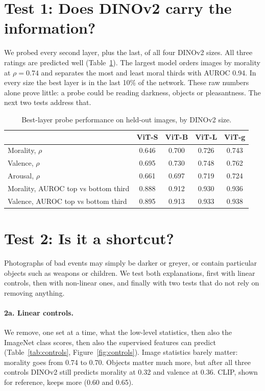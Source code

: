 \documentclass[11pt]{article}
\begin{document}
\section{Test 1: Does DINOv2 carry the information?}

We probed every second layer, plus the last, of all four DINOv2 sizes. All three ratings are predicted well (Table~\ref{tab:base}). The largest model orders images by morality at $\rho=0.74$ and separates the most and least moral thirds with AUROC 0.94. In every size the best layer is in the last 10\% of the network. These raw numbers alone prove little: a probe could be reading darkness, objects or pleasantness. The next two tests address that.

\begin{table}[ht]\centering\small
\begin{tabular}{lcccc}\toprule
 & ViT-S & ViT-B & ViT-L & ViT-g\\\midrule
Morality, $\rho$ & 0.646 & 0.700 & 0.726 & 0.743\\
Valence, $\rho$ & 0.695 & 0.730 & 0.748 & 0.762\\
Arousal, $\rho$ & 0.661 & 0.697 & 0.719 & 0.724\\
Morality, AUROC top vs bottom third & 0.888 & 0.912 & 0.930 & 0.936\\
Valence, AUROC top vs bottom third & 0.895 & 0.913 & 0.933 & 0.938\\\bottomrule
\end{tabular}
\caption{Best-layer probe performance on held-out images, by DINOv2 size.}\label{tab:base}
\end{table}

\section{Test 2: Is it a shortcut?}\label{sec:shortcuts}

Photographs of bad events may simply be darker or greyer, or contain particular objects such as weapons or children. We test both explanations, first with linear controls, then with non-linear ones, and finally with two tests that do not rely on removing anything.

\paragraph{2a. Linear controls.} We remove, one set at a time, what the low-level statistics, then also the ImageNet class scores, then also the supervised features can predict (Table~\ref{tab:controls}, Figure~\ref{fig:controls}). Image statistics barely matter: morality goes from 0.74 to 0.70. Objects matter much more, but after all three controls DINOv2 still predicts morality at 0.32 and valence at 0.36. CLIP, shown for reference, keeps more (0.60 and 0.65).
\end{document}
